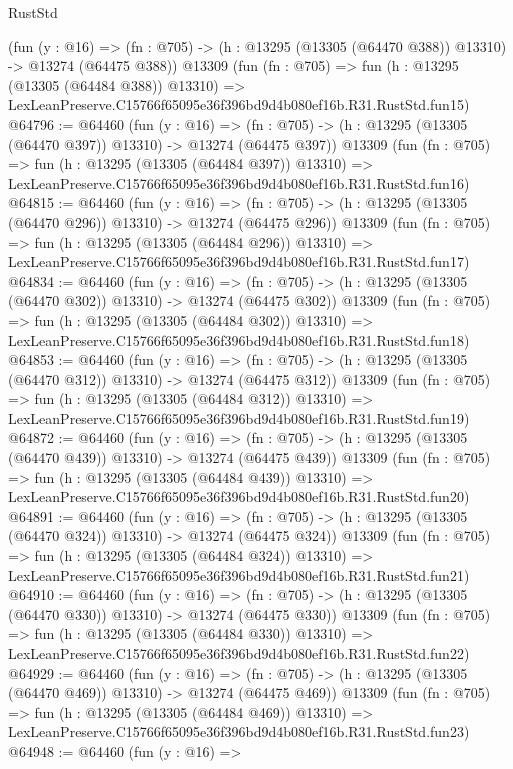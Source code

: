 \begin{lexlean}{RustStd}
\begin{coremodule}
    (fun (y : @16) =>
    (fn : @705) -> (h : @13295 (@13305 (@64470 @388)) @13310) -> @13274 (@64475 @388))
    @13309
    (fun (fn : @705) =>
    fun (h : @13295 (@13305 (@64484 @388)) @13310) =>
    LexLeanPreserve.C15766f65095e36f396bd9d4b080ef16b.R31.RustStd.fun15)
@64796 := @64460
    (fun (y : @16) =>
    (fn : @705) -> (h : @13295 (@13305 (@64470 @397)) @13310) -> @13274 (@64475 @397))
    @13309
    (fun (fn : @705) =>
    fun (h : @13295 (@13305 (@64484 @397)) @13310) =>
    LexLeanPreserve.C15766f65095e36f396bd9d4b080ef16b.R31.RustStd.fun16)
@64815 := @64460
    (fun (y : @16) =>
    (fn : @705) -> (h : @13295 (@13305 (@64470 @296)) @13310) -> @13274 (@64475 @296))
    @13309
    (fun (fn : @705) =>
    fun (h : @13295 (@13305 (@64484 @296)) @13310) =>
    LexLeanPreserve.C15766f65095e36f396bd9d4b080ef16b.R31.RustStd.fun17)
@64834 := @64460
    (fun (y : @16) =>
    (fn : @705) -> (h : @13295 (@13305 (@64470 @302)) @13310) -> @13274 (@64475 @302))
    @13309
    (fun (fn : @705) =>
    fun (h : @13295 (@13305 (@64484 @302)) @13310) =>
    LexLeanPreserve.C15766f65095e36f396bd9d4b080ef16b.R31.RustStd.fun18)
@64853 := @64460
    (fun (y : @16) =>
    (fn : @705) -> (h : @13295 (@13305 (@64470 @312)) @13310) -> @13274 (@64475 @312))
    @13309
    (fun (fn : @705) =>
    fun (h : @13295 (@13305 (@64484 @312)) @13310) =>
    LexLeanPreserve.C15766f65095e36f396bd9d4b080ef16b.R31.RustStd.fun19)
@64872 := @64460
    (fun (y : @16) =>
    (fn : @705) -> (h : @13295 (@13305 (@64470 @439)) @13310) -> @13274 (@64475 @439))
    @13309
    (fun (fn : @705) =>
    fun (h : @13295 (@13305 (@64484 @439)) @13310) =>
    LexLeanPreserve.C15766f65095e36f396bd9d4b080ef16b.R31.RustStd.fun20)
@64891 := @64460
    (fun (y : @16) =>
    (fn : @705) -> (h : @13295 (@13305 (@64470 @324)) @13310) -> @13274 (@64475 @324))
    @13309
    (fun (fn : @705) =>
    fun (h : @13295 (@13305 (@64484 @324)) @13310) =>
    LexLeanPreserve.C15766f65095e36f396bd9d4b080ef16b.R31.RustStd.fun21)
@64910 := @64460
    (fun (y : @16) =>
    (fn : @705) -> (h : @13295 (@13305 (@64470 @330)) @13310) -> @13274 (@64475 @330))
    @13309
    (fun (fn : @705) =>
    fun (h : @13295 (@13305 (@64484 @330)) @13310) =>
    LexLeanPreserve.C15766f65095e36f396bd9d4b080ef16b.R31.RustStd.fun22)
@64929 := @64460
    (fun (y : @16) =>
    (fn : @705) -> (h : @13295 (@13305 (@64470 @469)) @13310) -> @13274 (@64475 @469))
    @13309
    (fun (fn : @705) =>
    fun (h : @13295 (@13305 (@64484 @469)) @13310) =>
    LexLeanPreserve.C15766f65095e36f396bd9d4b080ef16b.R31.RustStd.fun23)
@64948 := @64460
    (fun (y : @16) =>

\end{coremodule}
\end{lexlean}
